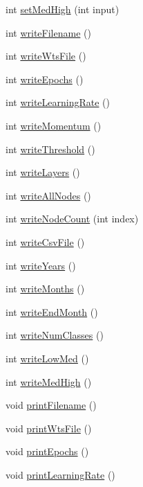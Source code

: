 \begin{DoxyCompactItemize}
\item 
int \hyperlink{classPrm_a99f9bef0b18293ecda0b4c58791aa096}{set\-Med\-High} (int input)
\item 
int \hyperlink{classPrm_a7c95d54b838af5cc5eb1a546340ad66d}{write\-Filename} ()
\item 
int \hyperlink{classPrm_a2d1fba043a69ff4452b1a3bda1c71c52}{write\-Wts\-File} ()
\item 
int \hyperlink{classPrm_a58398324312e3e653e8b345a3aebfc43}{write\-Epochs} ()
\item 
int \hyperlink{classPrm_a3b1b6521204140b6c56d450b771ebbee}{write\-Learning\-Rate} ()
\item 
int \hyperlink{classPrm_aabaeb35ae81344d55328566ed87f164c}{write\-Momentum} ()
\item 
int \hyperlink{classPrm_a49ec98de3482d89d6e9b9cde1444e13e}{write\-Threshold} ()
\item 
int \hyperlink{classPrm_a8e0729394c469d69718a761bf775a80c}{write\-Layers} ()
\item 
int \hyperlink{classPrm_a6082faed8463f87ea3f73094163b98cb}{write\-All\-Nodes} ()
\item 
int \hyperlink{classPrm_a98a553c1569c81741e8f541cd505bb26}{write\-Node\-Count} (int index)
\item 
int \hyperlink{classPrm_a7d7d954ff00075c6526138b772fc8a97}{write\-Csv\-File} ()
\item 
int \hyperlink{classPrm_afc37b6607442651ad6e04074d00039ba}{write\-Years} ()
\item 
int \hyperlink{classPrm_acefc4ca96b2c091cb8d62a1ba160df55}{write\-Months} ()
\item 
int \hyperlink{classPrm_afbd0a72bad12af497fc5db7f0f85dfe0}{write\-End\-Month} ()
\item 
int \hyperlink{classPrm_adaf097f098366dc34e71824ffcb020c2}{write\-Num\-Classes} ()
\item 
int \hyperlink{classPrm_a07f1dd78bdcb6202c2e99c3bbb4a447f}{write\-Low\-Med} ()
\item 
int \hyperlink{classPrm_ad3134a2c27c3910ae01d63ebb475c76d}{write\-Med\-High} ()
\item 
void \hyperlink{classPrm_afe55d01fb0f14f27ea5fe65a4fae2427}{print\-Filename} ()
\item 
void \hyperlink{classPrm_af0c4bd037982056f86597e002f3f432f}{print\-Wts\-File} ()
\item 
void \hyperlink{classPrm_a234c748d8d2eb0ed5e90a4888b20e97d}{print\-Epochs} ()
\item 
void \hyperlink{classPrm_ad595f033ede3bdea5851b06aa48507a7}{print\-Learning\-Rate} ()

\end{DoxyCompactItemize}
